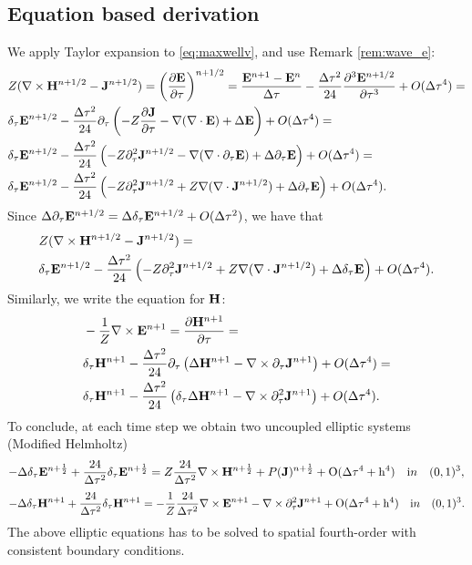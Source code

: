 \documentclass[12pt,reqno]{amsart}
\newcommand{\e}{{\bf E}}
\newcommand{\h}{{\bf H}}
\newcommand{\J}{{\bf J}}
\theoremstyle{definition}
\numberwithin{equation}{section}
\begin{document}
	\subsection{Equation based derivation}
	We apply Taylor expansion to \eqref{eq:maxwellv}, and use Remark \ref{rem:wave_e}:
	\begin{align*}
	&
	Z(\nabla \times \h^{n+1/2}-\J^{n+1/2})=	\left (  \frac{\partial \e}{\partial \tau} \right)^{n+1/2}=
		\frac{\e^{n+1} -\e^n}{\Delta \tau}-\frac{\Delta \tau^2}{24}\frac{\partial^3 \e^{n+1/2}}{\partial \tau^3}+O(\Delta \tau^4)=\\&
		\delta_{\tau}\e^{n+1/2}-\frac{\Delta \tau^2}{24}\partial_{\tau}
		\left(
		-Z\frac{\partial \J}{\partial \tau}-\nabla(\nabla \cdot \e)+\Delta \e
		\right)+O(\Delta \tau^4)=\\&
			\delta_{\tau}\e^{n+1/2}-\frac{\Delta \tau^2}{24}
		\left(
		-Z\partial_{\tau}^2\J^{n+1/2}
		-\nabla(\nabla\cdot\partial_\tau \e)+\Delta \partial_{\tau}\e
		\right)+O(\Delta \tau^4)=\\&
			\delta_{\tau}\e^{n+1/2}-\frac{\Delta \tau^2}{24}
		\left(
		-Z\partial_{\tau}^2\J^{n+1/2}
		+Z\nabla(\nabla\cdot\J^{n+1/2})+\Delta \partial_{\tau}\e
		\right)+O(\Delta \tau^4).
	\end{align*}
Since  $\Delta \partial_{\tau}\e^{n+1/2}=\Delta\delta_{\tau} \e^{n+1/2}+O(\Delta \tau^2) $,
we have 
that 
\begin{align*}
	&
		Z(\nabla \times \h^{n+1/2}-\J^{n+1/2})=\\&
	\delta_{\tau}\e^{n+1/2}-\frac{\Delta \tau^2}{24}
\left(
-Z\partial_{\tau}^2\J^{n+1/2}
+Z\nabla(\nabla\cdot\J^{n+1/2})+\Delta \delta_{\tau}\e
\right)+O(\Delta \tau^4).
\end{align*}
Similarly, we write the equation for $\h$:
\begin{align*}
	& 
	-\frac{1}{Z}\nabla \times \e^{n+1}=\frac{\partial \h^{n+1}}{\partial \tau}=\\&
	\delta_\tau \h^{n+1}-\frac{\Delta \tau^2}{24}\partial_{\tau}\left ( 
\Delta \h^{n+1}-\nabla \times \partial_{\tau}\J^{n+1}
	\right)+O(\Delta \tau^4)=\\&
		\delta_\tau \h^{n+1}-\frac{\Delta \tau^2}{24}\left ( 
	\delta_{\tau}\Delta\h^{n+1}-\nabla \times \partial_{\tau}^2\J^{n+1}
	\right)+O(\Delta \tau^4).
\end{align*}
To conclude, at each time step we obtain two uncoupled elliptic systems (Modified Helmholtz)
	$$
	-\Delta\delta_{\tau} \e^{n+\frac{1}{2}}+\frac{24}{\Delta \tau^2}\delta_{\tau}\e^{n+\frac{1}{2}}=
	Z\frac{24}{\Delta \tau^2}\nabla\times \h^{n+\frac{1}{2}}+P(\J)^{n+\frac{1}{2}}+
	\mathrm{O(\Delta \tau^4+h^4)} \quad {\mathrm in} \quad (0,1)^3,
	$$
		$$
	-\Delta \delta_{\tau}\h^{n+1}+\frac{24}{\Delta \tau^2}\delta_{\tau}\h^{n+1}=
	-\frac{1}{Z}\frac{24}{\Delta \tau^2}\nabla\times \e^{n+1}
	-\nabla\times\partial_{\tau}^2\J^{n+1}+
	\mathrm{O(\Delta \tau^4+h^4)} 
	\quad {\mathrm in} \quad (0,1)^3.
	$$
	The above elliptic equations has to be solved to spatial fourth-order with consistent boundary conditions.
	
\end{document}
